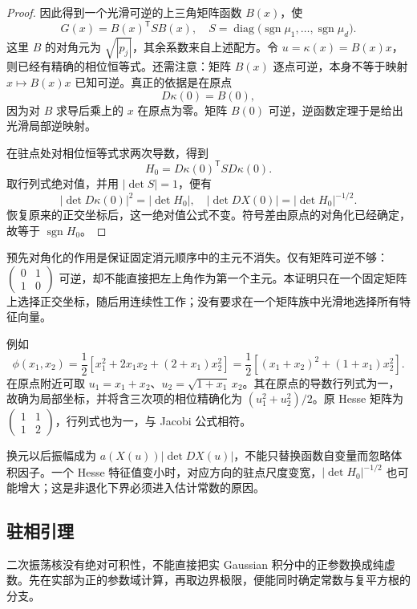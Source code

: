 \begin{proof}
因此得到一个光滑可逆的上三角矩阵函数 \(B(x)\)，使
\[
 G(x)=B(x)^{\mathsf T}S B(x),
 \quad
 S=\operatorname{diag}\bigl(\operatorname{sgn}\mu_1,\ldots,
                            \operatorname{sgn}\mu_d\bigr).
\]
这里 \(B\) 的对角元为 \(\sqrt{|p_j|}\)，其余系数来自上述配方。令
\(u=\kappa(x)=B(x)x\)，则已经有精确的相位恒等式。还需注意：矩阵 \(B(x)\) 逐点可逆，本身不等于映射 \(x\mapsto B(x)x\) 已知可逆。真正的依据是在原点
\[
 D\kappa(0)=B(0),
\]
因为对 \(B\) 求导后乘上的 \(x\) 在原点为零。矩阵 \(B(0)\) 可逆，逆函数定理于是给出光滑局部逆映射。

在驻点处对相位恒等式求两次导数，得到
\[
 H_0=D\kappa(0)^{\mathsf T}S D\kappa(0).
\]
取行列式绝对值，并用 \(|\det S|=1\)，便有
\[
 |\det D\kappa(0)|^2=|\det H_0|,
 \quad
 |\det DX(0)|=|\det H_0|^{-1/2}.
\]
恢复原来的正交坐标后，这一绝对值公式不变。符号差由原点的对角化已经确定，故等于 \(\operatorname{sgn}H_0\)。
\end{proof}

预先对角化的作用是保证固定消元顺序中的主元不消失。仅有矩阵可逆不够：\(\left(\begin{smallmatrix}0&1\\1&0\end{smallmatrix}\right)\) 可逆，却不能直接把左上角作为第一个主元。本证明只在一个固定矩阵上选择正交坐标，随后用连续性工作；没有要求在一个矩阵族中光滑地选择所有特征向量。

\ProseParagraphBreak

例如
\[
 \phi(x_1,x_2)=\frac12\left[x_1^2+2x_1x_2+(2+x_1)x_2^2\right]
 =\frac12\left[(x_1+x_2)^2+(1+x_1)x_2^2\right].
\]
在原点附近可取 \(u_1=x_1+x_2\)、\(u_2=\sqrt{1+x_1}\,x_2\)。其在原点的导数行列式为一，故确为局部坐标，并将含三次项的相位精确化为 \((u_1^2+u_2^2)/2\)。原 Hesse 矩阵为
\(\left(\begin{smallmatrix}1&1\\1&2\end{smallmatrix}\right)\)，行列式也为一，与 Jacobi 公式相符。

\ProseParagraphBreak

换元以后振幅成为 \(a(X(u))|\det DX(u)|\)，不能只替换函数自变量而忽略体积因子。一个 Hesse 特征值变小时，对应方向的驻点尺度变宽，\(|\det H_0|^{-1/2}\) 也可能增大；这是非退化下界必须进入估计常数的原因。

\subsection{驻相引理}
\label{b2:subsec:210203}

二次振荡核没有绝对可积性，不能直接把实 Gaussian 积分中的正参数换成纯虚数。先在实部为正的参数域计算，再取边界极限，便能同时确定常数与复平方根的分支。


